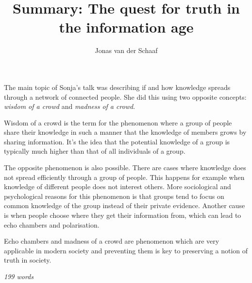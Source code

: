 \documentclass{article}
\title{Summary: The quest for truth in the information age}
\author{Jonas van der Schaaf}
\date{}
\begin{document}
\maketitle

The main topic of Sonja's talk was describing if and how knowledge spreads
through a network of connected people. She did this using two opposite concepts:
\emph{wisdom of a crowd} and \emph{madness of a crowd}.

Wisdom of a crowd is the term for the phenomenon where a group of people share
their knowledge in such a manner that the knowledge of members grows by sharing
information. It's the idea that the potential knowledge of a group is typically
much higher than that of all individuals of a group.

The opposite phenomenon is also possible. There are cases where knowledge does
not spread efficiently through a group of people. This happens for example when
knowledge of different people does not interest others. More sociological and
psychological reasons for this phenomenon is that groups tend to focus on common
knowledge of the group instead of their private evidence. Another cause is when
people choose where they get their information from, which can lead to echo
chambers and polarisation.

Echo chambers and madness of a crowd are phenomenon which are very applicable in
modern society and preventing them is key to preserving a notion of truth in
society.

\hfill{\emph{199 words}}
\end{document}
